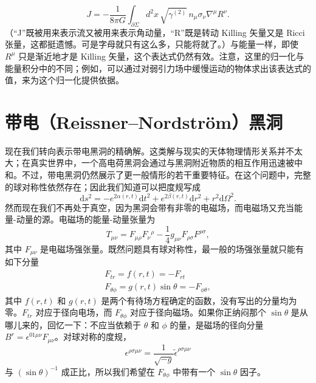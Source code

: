\begin{equation*}
\boxed{\,J = -\frac{1}{8\pi G}\int_{\partial\Sigma} d^{2}x\,\sqrt{\gamma^{(2)}}\, n_{\mu}\sigma_{\nu}\nabla^{\mu}R^{\nu}.\,}
\tag{6.48}
\end{equation*}
（“J”既被用来表示流又被用来表示角动量，“R”既是转动 Killing 矢量又是 Ricci 张量，这都挺遗憾。可是字母就只有这么多，只能将就了。）与能量一样，即使 $R^{\mu}$ 只是渐近地才是 Killing 矢量，这个表达式仍然有效。注意，这里的归一化与能量积分中的不同；例如，可以通过对弱引力场中缓慢运动的物体求出该表达式的值，来为这个归一化提供依据。

\section{带电（Reissner–Nordström）黑洞}

现在我们转向表示带电黑洞的精确解。这类解与现实的天体物理情形关系并不太大；在真实世界中，一个高电荷黑洞会通过与黑洞附近物质的相互作用迅速被中和。不过，带电黑洞仍然展示了更一般情形的若干重要特征。在这个问题中，完整的球对称性依然存在；因此我们知道可以把度规写成
\begin{equation*}
\mathrm{d}s^{2} = -e^{2\alpha(r,t)}\mathrm{d}t^{2} + e^{2\beta(r,t)}\mathrm{d}r^{2} + r^{2}\mathrm{d}\Omega^{2}.
\tag{6.49}
\end{equation*}
然而现在我们不再处于真空，因为黑洞会带有非零的电磁场，而电磁场又充当能量-动量的源。电磁场的能量-动量张量为
\begin{equation*}
T_{\mu\nu} = F_{\mu\rho}F_{\nu}{}^{\rho} - \frac{1}{4}g_{\mu\nu}F_{\rho\sigma}F^{\rho\sigma},
\tag{6.50}
\end{equation*}
其中 $F_{\mu\nu}$ 是电磁场强张量。既然问题具有球对称性，最一般的场强张量就只能有如下分量
\begin{gather*}
F_{tr} = f(r,t) = -F_{rt}\\
F_{\theta\phi} = g(r,t)\sin\theta = -F_{\phi\theta},
\tag{6.51}
\end{gather*}
其中 $f(r,t)$ 和 $g(r,t)$ 是两个有待场方程确定的函数，没有写出的分量均为零。$F_{tr}$ 对应于径向电场，而 $F_{\theta\phi}$ 对应于径向磁场。如果你正纳闷那个 $\sin\theta$ 是从哪儿来的，回忆一下：不应当依赖于 $\theta$ 和 $\phi$ 的量，是磁场的径向分量 $B^{r}=\epsilon^{01\mu\nu}F_{\mu\nu}$。对球对称的度规，
\begin{equation*}
\epsilon^{\rho\sigma\mu\nu} = \frac{1}{\sqrt{-g}}\tilde{\epsilon}^{\rho\sigma\mu\nu}
\end{equation*}
与 $(\sin\theta)^{-1}$ 成正比，所以我们希望在 $F_{\theta\phi}$ 中带有一个 $\sin\theta$ 因子。

